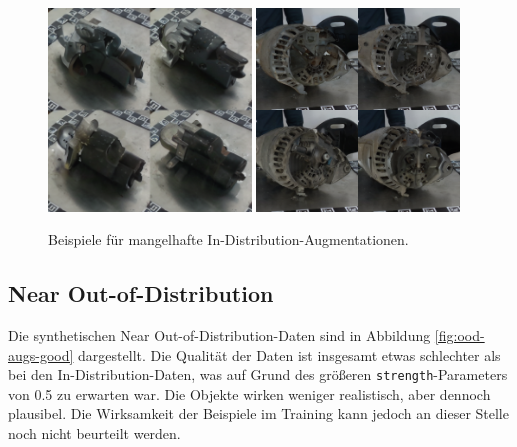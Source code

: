 \begin{figure}
	\centering
	\includegraphics[width=0.48\textwidth]{figure_results_id-augs_bad_1.png}%
	\hspace{0.02\textwidth}\includegraphics[width=0.48\textwidth]{figure_results_id-augs_bad_2.png}
	\caption{Beispiele für mangelhafte In-Distribution-Augmentationen.}
	\label{fig:id-augs-bad}
\end{figure}

\subsection{Near Out-of-Distribution} \label{sec:da-fusion-ood-results}

Die synthetischen Near Out-of-Distribution-Daten sind in Abbildung \ref{fig:ood-augs-good} dargestellt. Die Qualität der Daten ist insgesamt etwas schlechter als bei den In-Distribution-Daten, was auf Grund des größeren \lstinline{strength}-Parameters von 0.5 zu erwarten war. Die Objekte wirken weniger realistisch, aber dennoch plausibel. Die Wirksamkeit der Beispiele im Training kann jedoch an dieser Stelle noch nicht beurteilt werden.

